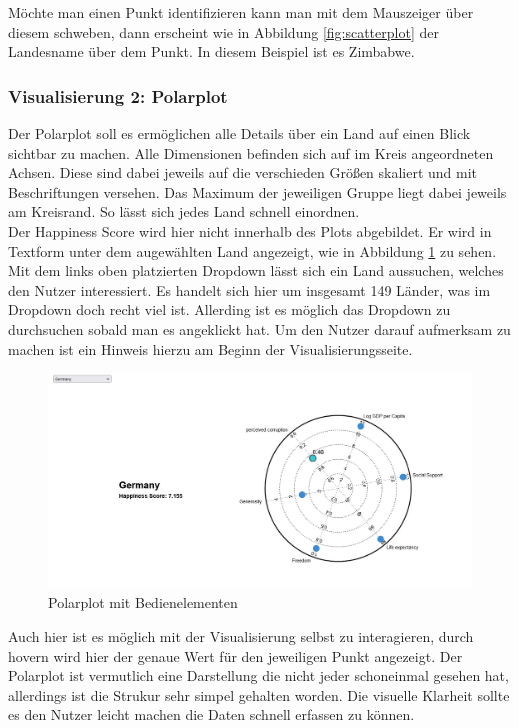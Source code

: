 Möchte man einen Punkt identifizieren kann man mit dem Mauszeiger über diesem schweben, dann erscheint wie in Abbildung \ref{fig:scatterplot} der Landesname über dem Punkt. In diesem Beispiel ist es Zimbabwe. 


\subsubsection{Visualisierung 2: Polarplot}

Der Polarplot soll es ermöglichen alle Details über ein Land auf einen Blick sichtbar zu machen. Alle Dimensionen befinden sich auf im Kreis angeordneten Achsen. Diese sind dabei jeweils auf die verschieden Größen skaliert und mit Beschriftungen versehen. Das Maximum der jeweiligen Gruppe liegt dabei jeweils am Kreisrand. So lässt sich jedes Land schnell einordnen. \\

Der Happiness Score wird hier nicht innerhalb des Plots abgebildet. Er wird in Textform unter dem augewählten Land angezeigt, wie in Abbildung \ref{fig:polarplot} zu sehen. Mit dem links oben platzierten Dropdown lässt sich ein Land aussuchen, welches den Nutzer interessiert. Es handelt sich hier um insgesamt 149 Länder, was im Dropdown doch recht viel ist. Allerding ist es möglich das Dropdown zu durchsuchen sobald man es angeklickt hat. Um den Nutzer darauf aufmerksam zu machen ist ein Hinweis hierzu am Beginn der Visualisierungsseite. 

\begin{figure}[h]
 \centering
 \includegraphics[width = \textwidth]{img/polarplot.jpg}
 \caption{Polarplot mit Bedienelementen}
 \label{fig:polarplot}
\end{figure}

Auch hier ist es möglich mit der Visualisierung selbst zu interagieren, durch hovern wird hier der genaue Wert für den jeweiligen Punkt angezeigt. Der Polarplot ist vermutlich eine Darstellung die nicht jeder schoneinmal gesehen hat, allerdings ist die Strukur sehr simpel gehalten worden. Die visuelle Klarheit sollte es den Nutzer leicht machen die Daten schnell erfassen zu können. \\

